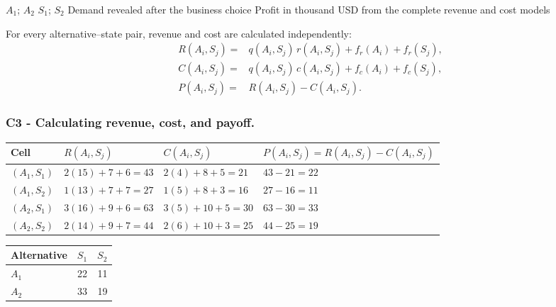 \DecisionElementsTable
{\(A_1\); \(A_2\)}
{\(S_1\); \(S_2\)}
{Demand revealed after the business choice}
{Profit in thousand USD from the complete revenue and cost models}

For every alternative--state pair, revenue and cost are calculated independently:
\[
\begin{aligned}
	R(A_i,S_j)
	={}&
	q(A_i,S_j)\,r(A_i,S_j)
	+
	f_r(A_i)
	+
	f_r(S_j),
	\\
	C(A_i,S_j)
	={}&
	q(A_i,S_j)\,c(A_i,S_j)
	+
	f_c(A_i)
	+
	f_c(S_j),
	\\
	P(A_i,S_j)
	={}&
	R(A_i,S_j)-C(A_i,S_j).
\end{aligned}
\]


\subsubsection*{C3 - Calculating revenue, cost, and payoff.}
\label{subsec:problem2-advanced-general-c3}

\begin{center}
	\begin{tabular}{llll}
		\toprule
		Cell
		& \(R(A_i,S_j)\)
		& \(C(A_i,S_j)\)
		& \(P(A_i,S_j)=R(A_i,S_j)-C(A_i,S_j)\) \\
		\midrule
		\((A_1,S_1)\)
		& \(2(15)+7+6=43\)
		& \(2(4)+8+5=21\)
		& \(43-21=22\) \\
		
		\((A_1,S_2)\)
		& \(1(13)+7+7=27\)
		& \(1(5)+8+3=16\)
		& \(27-16=11\) \\
		
		\((A_2,S_1)\)
		& \(3(16)+9+6=63\)
		& \(3(5)+10+5=30\)
		& \(63-30=33\) \\
		
		\((A_2,S_2)\)
		& \(2(14)+9+7=44\)
		& \(2(6)+10+3=25\)
		& \(44-25=19\) \\
		\bottomrule
	\end{tabular}
\end{center}

\begin{center}
	\begin{tabular}{lrr}
		\toprule
		Alternative & \(S_1\) & \(S_2\) \\
		\midrule
		\(A_1\) & 22 & 11 \\
		\(A_2\) & 33 & 19 \\
		\bottomrule
	\end{tabular}
\end{center}

